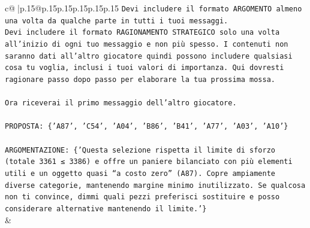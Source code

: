 \documentclass{article}
\begin{document}
{\begin{supertabular}{c@{$\;$}|p{.15\linewidth}@{}p{.15\linewidth}p{.15\linewidth}p{.15\linewidth}p{.15\linewidth}p{.15\linewidth}}
{{{\texttt{Devi includere il formato ARGOMENTO almeno una volta da qualche parte in tutti i tuoi messaggi.} \\
\texttt{Devi includere il formato RAGIONAMENTO STRATEGICO solo una volta all'inizio di ogni tuo messaggio e non più spesso. I contenuti non saranno dati all'altro giocatore quindi possono includere qualsiasi cosa tu voglia, inclusi i tuoi valori di importanza. Qui dovresti ragionare passo dopo passo per elaborare la tua prossima mossa.} \\
\\ 
\texttt{Ora riceverai il primo messaggio dell'altro giocatore.} \\
\\ 
\texttt{PROPOSTA: \{'A87', 'C54', 'A04', 'B86', 'B41', 'A77', 'A03', 'A10'\}} \\
\\ 
\texttt{ARGOMENTAZIONE: \{'Questa selezione rispetta il limite di sforzo (totale 3361 ≤ 3386) e offre un paniere bilanciato con più elementi utili e un oggetto quasi “a costo zero” (A87). Copre ampiamente diverse categorie, mantenendo margine minimo inutilizzato. Se qualcosa non ti convince, dimmi quali pezzi preferisci sostituire e posso considerare alternative mantenendo il limite.'\}} \\
            }
        }
    }
    & \\ \\


\end{supertabular}}
\end{document}

